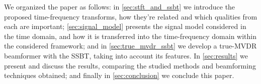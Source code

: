 We organized the paper as follows:
in \cref{sec:stft_and_ssbt} we introduce the proposed time-frequency transforms, how they're related and which qualities from each are important;
\cref{sec:signal_model} presents the signal model considered in the time domain, and how it is transferred into the time-frequency domain within the considered framework;
and in \cref{sec:true_mvdr_ssbt} we develop a true-MVDR beamformer with the SSBT, taking into account its features. In \cref{sec:results} we present and discuss the results, comparing the studied methods and beamforming techniques obtained; and finally in \cref{sec:conclusion} we conclude this paper.